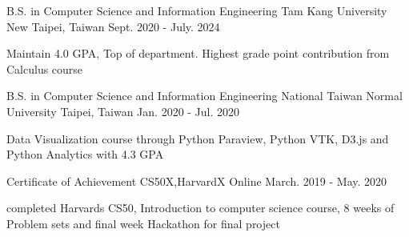 

\begin{cventries}

  \cventry
    {B.S. in Computer Science and Information Engineering} %
    {Tam Kang University} %
    {New Taipei, Taiwan} %
    {Sept. 2020 - July. 2024} %
    {
      \begin{cvitems} %
        \item {Maintain 4.0 GPA, Top of department. Highest grade point contribution from Calculus course}
      \end{cvitems}
    }

  \cventry
    {B.S. in Computer Science and Information Engineering} %
    {National Taiwan Normal University} %
    {Taipei, Taiwan} %
    {Jan. 2020 - Jul. 2020} %
    {
      \begin{cvitems} %
        \item {Data Visualization course through Python Paraview, Python VTK, D3.js and Python Analytics with 4.3 GPA}
      \end{cvitems}
    }
  \cventry
    {Certificate of Achievement} %
    {CS50X,HarvardX} %
    {Online} %
    {March. 2019 - May. 2020} %
    {
      \begin{cvitems} %
        \item {completed Harvards CS50, Introduction to computer science course, 8 weeks of Problem sets and final week Hackathon for final project}
      \end{cvitems}
    }
\end{cventries}

